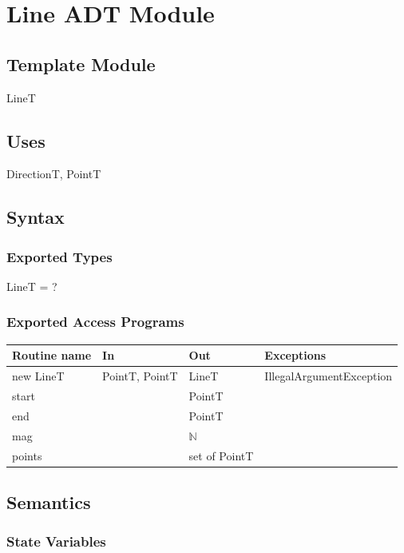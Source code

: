\documentclass[12pt]{article}
\begin{document}
\newpage

\section* {Line ADT Module}

\subsection*{Template Module}

LineT

\subsection* {Uses}

DirectionT, PointT

\subsection* {Syntax}

\subsubsection* {Exported Types}

LineT = ?

\subsubsection* {Exported Access Programs}

\begin{tabular}{| l | l | l | l |}
	\hline
	\textbf{Routine name} & \textbf{In} & \textbf{Out} & \textbf{Exceptions}\\
	\hline
	new LineT & PointT, PointT & LineT & IllegalArgumentException \\
	\hline
	start & ~ & PointT & ~\\
	\hline
	end & ~ & PointT & ~\\
	\hline
	mag & ~ & $\mathbb{N}$ & ~\\
	\hline
	points & ~ & set of PointT & ~\\
	\hline
\end{tabular}

\subsection* {Semantics}

\subsubsection* {State Variables}
\end{document}

